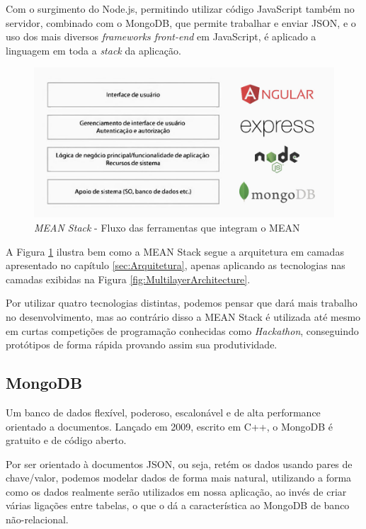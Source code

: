 \documentclass[
	12pt,				%
	openright,			%
	twoside,			%
	a4paper,			%
	english,			%
	brazil				%
	]{abntex2}
\begin{document}
Com o surgimento do Node.js, permitindo utilizar código JavaScript também no servidor, combinado com o MongoDB, que permite trabalhar e enviar JSON, e o uso dos mais diversos \textit{frameworks front-end} em JavaScript, é aplicado a linguagem em toda a \textit{stack} da aplicação.

\begin{figure}[h]
	\centering

	\caption{\textit{MEAN Stack} - Fluxo das ferramentas que integram o MEAN} \label{fig:MEANStackFlow}
    \includegraphics[scale=0.4]{mean-stack-flow}

\end{figure}

A Figura \ref{fig:MEANStackFlow} ilustra bem como a MEAN Stack segue a arquitetura em camadas apresentado no capítulo \ref{sec:Arquitetura}, apenas aplicando as tecnologias nas camadas exibidas na Figura \ref{fig:MultilayerArchitecture}.

Por utilizar quatro tecnologias distintas, podemos pensar que dará mais trabalho no desenvolvimento, mas ao contrário disso a MEAN Stack é utilizada até mesmo em curtas competições de programação conhecidas como \textit{Hackathon}, conseguindo protótipos de forma rápida provando assim sua produtividade.

\subsection{MongoDB}

Um banco de dados flexível, poderoso, escalonável e de alta performance orientado a documentos. Lançado em 2009, escrito em C++, o MongoDB é gratuito e de código aberto.

Por ser orientado à documentos JSON, ou seja, retém os dados usando pares de chave/valor, podemos modelar dados de forma mais natural, utilizando a forma como os dados realmente serão utilizados em nossa aplicação, ao invés de criar várias ligações entre tabelas, o que o dá a característica ao MongoDB de banco não-relacional.
\end{document}
